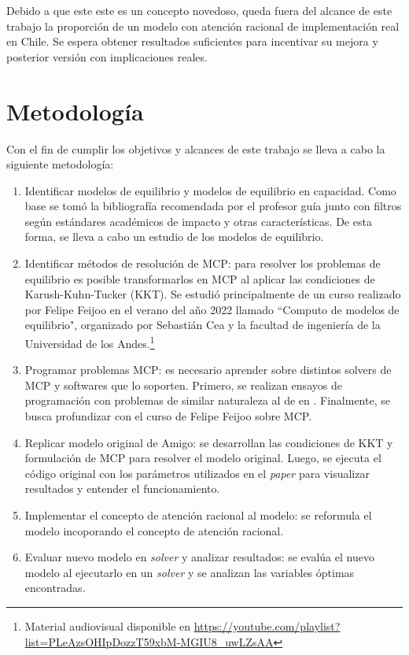Debido a que este este es un concepto novedoso, queda fuera del alcance de este trabajo la proporción de un modelo con atención racional de implementación real en Chile. Se espera obtener resultados suficientes para incentivar su mejora y posterior versión con implicaciones reales.

\section{Metodología}
Con el fin de cumplir los objetivos y alcances de este trabajo se lleva a cabo la siguiente metodología:

\begin{enumerate}
\item Identificar modelos de equilibrio y modelos de equilibrio en capacidad. Como base se tomó la bibliografía recomendada por el profesor guía junto con filtros según estándares académicos de impacto y otras características. De esta forma, se lleva a cabo un estudio de los modelos de equilibrio.

\item Identificar métodos de resolución de MCP: para resolver los problemas de equilibrio es posible transformarlos en MCP al aplicar las condiciones de Karush-Kuhn-Tucker (KKT). Se estudió principalmente de un curso realizado por Felipe Feijoo en el verano del año 2022 llamado ``Computo de modelos de equilibrio", organizado por Sebastián Cea y la facultad de ingeniería de la Universidad de los Andes.\footnote{Material audiovisual disponible en \url{https://youtube.com/playlist?list=PLeAzsOHIpDozzT59xbM-MGIU8_uwLZsAA}}   

\item Programar problemas MCP: es necesario aprender sobre distintos solvers de MCP y softwares que lo soporten. Primero, se realizan ensayos de programación con problemas de similar naturaleza al de  en . Finalmente, se busca profundizar con el curso de Felipe Feijoo sobre MCP. 

\item Replicar modelo original de Amigo: se desarrollan las condiciones de KKT y formulación de MCP para resolver el modelo original. Luego, se ejecuta el código original con los parámetros utilizados en el \textit{paper} para visualizar resultados y entender el funcionamiento.

\item Implementar el concepto de atención racional al modelo: se reformula el modelo incoporando el concepto de atención racional.

\item Evaluar nuevo modelo en \textit{solver} y analizar resultados: se evalúa el nuevo modelo al ejecutarlo en un \textit{solver} y se analizan las variables óptimas encontradas.
\end{enumerate}


